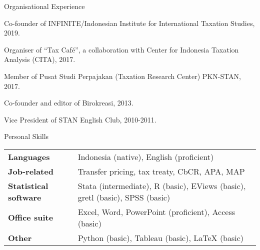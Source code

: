 \documentclass{resume}
\begin{document}
\begin{rSection}{Organisational Experience} 
\item Co-founder of INFINITE/Indonesian Institute for International Taxation Studies, 2019.
\item Organiser of “Tax Café”, a collaboration with Center for Indonesia Taxation Analysis (CITA), 2017.
\item Member of Pusat Studi Perpajakan (Taxation Research Center) PKN-STAN, 2017.
\item Co-founder and editor of Birokreasi, 2013.
\item Vice President of STAN English Club, 2010-2011.
\end{rSection}

\begin{rSection}{Personal Skills}

\begin{tabular}{p{4cm}p{12.6cm}}
\textbf{Languages} & Indonesia (native), English (proficient) \\
\textbf{Job-related} & Transfer pricing, tax treaty, CbCR, APA, MAP\\
\textbf{Statistical software} & Stata (intermediate), R (basic), EViews (basic), gretl (basic), SPSS (basic) \\
\textbf{Office suite} & Excel, Word, PowerPoint (proficient), Access (basic)\\
\textbf{Other} & Python (basic), Tableau (basic), {\LaTeX} (basic)\\

\end{tabular}

\end{rSection}
\end{document}
